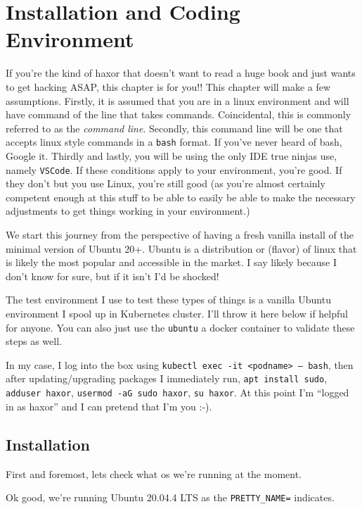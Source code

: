 \chapter{Installation and Coding Environment}
\minitoc
If you're the kind of haxor that doesn't want to read a huge book and just wants to get hacking ASAP, this chapter is for you!! This chapter will make a few assumptions. Firstly, it is assumed that you are in a linux environment and will have command of the line that takes commands. Coincidental, this is commonly referred to as the \emph{command line}. Secondly, this command line will be one that accepts linux style commands in a \texttt{bash} format. If you've never heard of bash, Google it. Thirdly and lastly, you will be using the only IDE true ninjas use, namely \texttt{VSCode}. If these conditions apply to your environment, you're good. If they don't but you use Linux, you're still good (as you're almost certainly competent enough at this stuff to be able to easily be able to make the necessary adjustments to get things working in your environment.)

We start this journey from the perspective of having a fresh vanilla install of the minimal version of Ubuntu 20+. Ubuntu is a distribution or (flavor) of linux that is likely the most popular and accessible in the market. I say likely because I don't know for sure, but if it isn't I'd be shocked!

\begin{nerd}
    The test environment I use to test these types of things is a vanilla Ubuntu environment I spool up in Kubernetes cluster. I'll throw it here below if helpful for anyone. You can also just use the \texttt{ubuntu} a docker container to validate these steps as well.
    \par
    In my case, I log into the box using \texttt{kubectl exec -it <podname> -- bash}, then after updating/upgrading packages I immediately run, \texttt{apt install sudo}, \texttt{adduser haxor}, \texttt{usermod -aG sudo haxor}, \texttt{su haxor}.
    At this point I'm ``logged in as haxor'' and I can pretend that I'm you :-).
\end{nerd}

\section{Installation}
First and foremost, lets check what os we're running at the moment.
\par
{}
Ok good, we're running Ubuntu 20.04.4 LTS as the \texttt{PRETTY\_NAME=} indicates.

